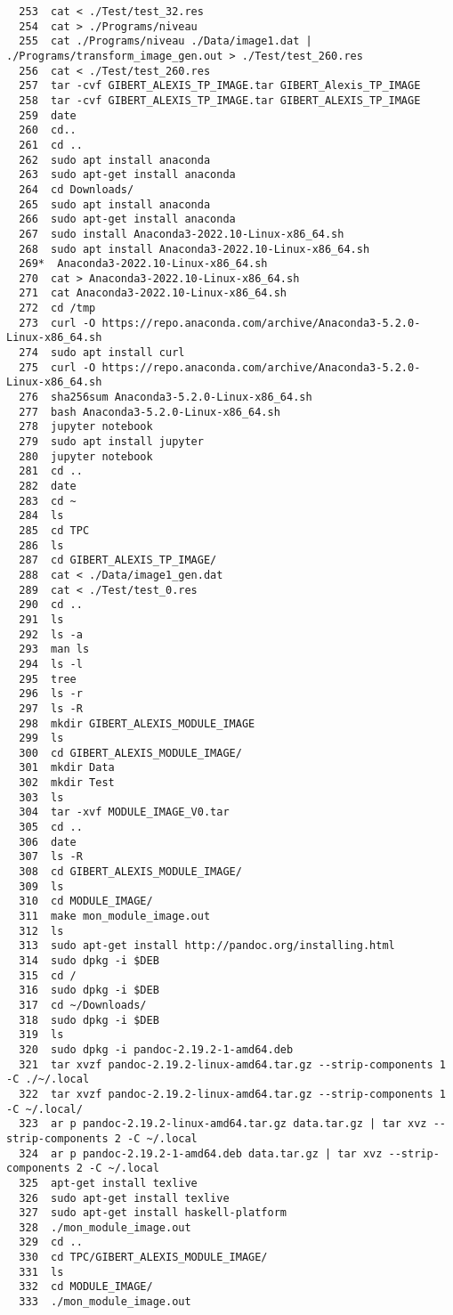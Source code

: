\documentclass[11pt]{article}
\begin{document}
\begin{verbatim}
  253  cat < ./Test/test_32.res 
  254  cat > ./Programs/niveau
  255  cat ./Programs/niveau ./Data/image1.dat | ./Programs/transform_image_gen.out > ./Test/test_260.res
  256  cat < ./Test/test_260.res 
  257  tar -cvf GIBERT_ALEXIS_TP_IMAGE.tar GIBERT_Alexis_TP_IMAGE
  258  tar -cvf GIBERT_ALEXIS_TP_IMAGE.tar GIBERT_ALEXIS_TP_IMAGE
  259  date
  260  cd..
  261  cd ..
  262  sudo apt install anaconda
  263  sudo apt-get install anaconda
  264  cd Downloads/
  265  sudo apt install anaconda
  266  sudo apt-get install anaconda
  267  sudo install Anaconda3-2022.10-Linux-x86_64.sh 
  268  sudo apt install Anaconda3-2022.10-Linux-x86_64.sh 
  269*  Anaconda3-2022.10-Linux-x86_64.sh 
  270  cat > Anaconda3-2022.10-Linux-x86_64.sh 
  271  cat Anaconda3-2022.10-Linux-x86_64.sh 
  272  cd /tmp
  273  curl -O https://repo.anaconda.com/archive/Anaconda3-5.2.0-Linux-x86_64.sh
  274  sudo apt install curl
  275  curl -O https://repo.anaconda.com/archive/Anaconda3-5.2.0-Linux-x86_64.sh
  276  sha256sum Anaconda3-5.2.0-Linux-x86_64.sh
  277  bash Anaconda3-5.2.0-Linux-x86_64.sh
  278  jupyter notebook
  279  sudo apt install jupyter
  280  jupyter notebook
  281  cd ..
  282  date
  283  cd ~
  284  ls
  285  cd TPC
  286  ls
  287  cd GIBERT_ALEXIS_TP_IMAGE/
  288  cat < ./Data/image1_gen.dat 
  289  cat < ./Test/test_0.res 
  290  cd ..
  291  ls
  292  ls -a
  293  man ls
  294  ls -l
  295  tree
  296  ls -r
  297  ls -R
  298  mkdir GIBERT_ALEXIS_MODULE_IMAGE
  299  ls
  300  cd GIBERT_ALEXIS_MODULE_IMAGE/
  301  mkdir Data
  302  mkdir Test
  303  ls
  304  tar -xvf MODULE_IMAGE_V0.tar
  305  cd ..
  306  date
  307  ls -R
  308  cd GIBERT_ALEXIS_MODULE_IMAGE/
  309  ls
  310  cd MODULE_IMAGE/
  311  make mon_module_image.out
  312  ls
  313  sudo apt-get install http://pandoc.org/installing.html
  314  sudo dpkg -i $DEB
  315  cd /
  316  sudo dpkg -i $DEB
  317  cd ~/Downloads/
  318  sudo dpkg -i $DEB
  319  ls
  320  sudo dpkg -i pandoc-2.19.2-1-amd64.deb 
  321  tar xvzf pandoc-2.19.2-linux-amd64.tar.gz --strip-components 1 -C ./~/.local
  322  tar xvzf pandoc-2.19.2-linux-amd64.tar.gz --strip-components 1 -C ~/.local/
  323  ar p pandoc-2.19.2-linux-amd64.tar.gz data.tar.gz | tar xvz --strip-components 2 -C ~/.local
  324  ar p pandoc-2.19.2-1-amd64.deb data.tar.gz | tar xvz --strip-components 2 -C ~/.local
  325  apt-get install texlive
  326  sudo apt-get install texlive
  327  sudo apt-get install haskell-platform
  328  ./mon_module_image.out
  329  cd ..
  330  cd TPC/GIBERT_ALEXIS_MODULE_IMAGE/
  331  ls
  332  cd MODULE_IMAGE/
  333  ./mon_module_image.out

\end{verbatim}
\end{document}
